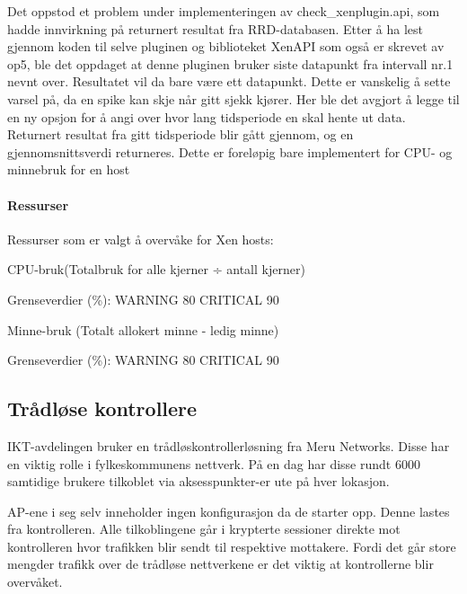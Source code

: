 Det oppstod et problem under implementeringen av check\_xenplugin.api, som hadde innvirkning på returnert resultat fra RRD-databasen. Etter å ha lest gjennom koden til selve pluginen og biblioteket XenAPI som også er skrevet av op5, ble det oppdaget at denne pluginen bruker siste datapunkt fra intervall nr.1 nevnt over. Resultatet vil da bare være ett datapunkt. Dette er vanskelig å sette varsel på, da en spike kan skje når gitt sjekk kjører. Her ble det avgjort å legge til en ny opsjon for å angi over hvor lang tidsperiode en skal hente ut data. Returnert resultat fra gitt tidsperiode blir gått gjennom, og en gjennomsnittsverdi returneres. Dette er foreløpig bare implementert for CPU- og minnebruk for en host

\paragraph{Ressurser}
Ressurser som er valgt å overvåke for Xen hosts:

\begin{itemize*}
        \item CPU-bruk(Totalbruk for alle kjerner ÷ antall kjerner)
        \begin{itemize*}
                \item Grenseverdier (\%): WARNING 80 CRITICAL 90
        \end{itemize*}
        \item Minne-bruk (Totalt allokert minne - ledig minne)
        \begin{itemize*}
                \item Grenseverdier (\%): WARNING 80 CRITICAL 90
        \end{itemize*}
\end{itemize*}

\subsection{Trådløse kontrollere}
IKT-avdelingen bruker en trådløskontrollerløsning fra Meru Networks. Disse har en viktig rolle i fylkeskommunens nettverk. På en dag har disse rundt 6000 samtidige brukere tilkoblet via aksesspunkter-er ute på hver lokasjon.

AP-ene i seg selv inneholder ingen konfigurasjon da de starter opp. Denne lastes fra kontrolleren. Alle tilkoblingene går i krypterte sessioner direkte mot kontrolleren hvor trafikken blir sendt til respektive mottakere. Fordi det går store mengder trafikk over de trådløse nettverkene er det viktig at kontrollerne blir overvåket.

